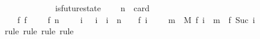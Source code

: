 \begin{isabellebody}
\ \ {\isachardoublequoteopen}{\isasymforall}\ {\isasymsigma}\ {\isasymsigma}{\isacharprime}{\isachardot}\ {\isasymsigma}\ {\isasymin}\ {\isasymSigma}\ {\isasymand}\ {\isasymsigma}{\isacharprime}\ {\isasymin}\ {\isasymSigma}\ {\isasymand}\ is{\isacharunderscore}future{\isacharunderscore}state{\isacharparenleft}{\isasymsigma}{\isacharcomma}\ {\isasymsigma}{\isacharprime}{\isacharparenright}\isanewline
\ \ {\isasymlongrightarrow}\ n\ {\isacharequal}\ card\ {\isacharparenleft}{\isasymsigma}{\isacharprime}\ {\isacharminus}\ {\isasymsigma}{\isacharparenright}\ \ \isanewline
\ \ {\isasymlongrightarrow}\ {\isacharparenleft}{\isasymexists}\ f{\isachardot}\ f\ {}\ {\isacharequal}\ {\isasymsigma}\ {\isasymand}\ f\ n\ {\isacharequal}\ {\isasymsigma}{\isacharprime}\ {\isasymand}\ {\isacharparenleft}{\isasymforall}\ i{\isachardot}\ {}\ {\isasymle}\ i\ {\isasymand}\ i\ {\isasymle}\ n\ {\isacharminus}\ {}\ {\isasymlongrightarrow}\ f\ i\ {\isasymin}\ {\isasymSigma}\ {\isasymand}\ {\isacharparenleft}{\isasymexists}\ m\ {\isasymin}\ M{\isachardot}\ f\ i\ {\isasymunion}\ {\isacharbraceleft}m{\isacharbraceright}\ {\isacharequal}\ f\ {\isacharparenleft}Suc\ i{\isacharparenright}{\isacharparenright}{\isacharparenright}{\isacharparenright}{\isachardoublequoteclose}\ \isanewline
%
\isadelimproof
\ \ %
\endisadelimproof
%
\isatagproof
{}\isamarkupfalse%
\ {\isacharparenleft}rule{\isacharcomma}\ rule{\isacharcomma}\ rule{\isacharcomma}\ rule{\isacharparenright}\ \isanewline
\ \ \isamarkupfalse%
%
\endisatagproof
{\isafoldproof}%
%
\isadelimproof
\isanewline
%
\endisadelimproof
%
\isadelimtheory
\isanewline
%
\endisadelimtheory
%
\isatagtheory
{}\isamarkupfalse%
%
\endisatagtheory
{\isafoldtheory}%
%
\isadelimtheory
%
\endisadelimtheory
%
\end{isabellebody}%
\endinput
